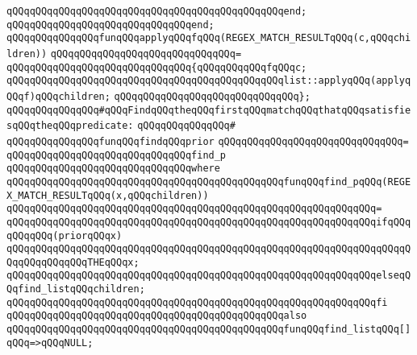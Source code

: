 \verb|qQQqqQQqqQQqqQQqqQQqqQQqqQQqqQQqqQQqqQQqqQQqqQQqend;|\newline
\verb|qQQqqQQqqQQqqQQqqQQqqQQqqQQqqQQqend;|\newline
\newline
\newline
\verb|qQQqqQQqqQQqqQQqfunqQQqapplyqQQqfqQQq(REGEX_MATCH_RESULTqQQq(c,qQQqchildren))|\newline
\verb|qQQqqQQqqQQqqQQqqQQqqQQqqQQqqQQq=|\newline
\verb|qQQqqQQqqQQqqQQqqQQqqQQqqQQqqQQq{qQQqqQQqqQQqfqQQqc;|\newline
\verb|qQQqqQQqqQQqqQQqqQQqqQQqqQQqqQQqqQQqqQQqqQQqqQQqlist::applyqQQq(applyqQQqf)qQQqchildren;|\newline
\verb|qQQqqQQqqQQqqQQqqQQqqQQqqQQqqQQq};|\newline
\newline
\newline
\verb|qQQqqQQqqQQqqQQq#qQQqFindqQQqtheqQQqfirstqQQqmatchqQQqthatqQQqsatisfiesqQQqtheqQQqpredicate:|\newline
\verb|qQQqqQQqqQQqqQQq#|\newline
\verb|qQQqqQQqqQQqqQQqfunqQQqfindqQQqprior|\newline
\verb|qQQqqQQqqQQqqQQqqQQqqQQqqQQqqQQq=|\newline
\verb|qQQqqQQqqQQqqQQqqQQqqQQqqQQqqQQqfind_p|\newline
\verb|qQQqqQQqqQQqqQQqqQQqqQQqqQQqqQQqwhere|\newline
\verb|qQQqqQQqqQQqqQQqqQQqqQQqqQQqqQQqqQQqqQQqqQQqqQQqfunqQQqfind_pqQQq(REGEX_MATCH_RESULTqQQq(x,qQQqchildren))|\newline
\verb|qQQqqQQqqQQqqQQqqQQqqQQqqQQqqQQqqQQqqQQqqQQqqQQqqQQqqQQqqQQqqQQq=|\newline
\verb|qQQqqQQqqQQqqQQqqQQqqQQqqQQqqQQqqQQqqQQqqQQqqQQqqQQqqQQqqQQqqQQqifqQQqqQQqqQQq(priorqQQqx)|\newline
\verb|qQQqqQQqqQQqqQQqqQQqqQQqqQQqqQQqqQQqqQQqqQQqqQQqqQQqqQQqqQQqqQQqqQQqqQQqqQQqqQQqqQQqTHEqQQqx;|\newline
\verb|qQQqqQQqqQQqqQQqqQQqqQQqqQQqqQQqqQQqqQQqqQQqqQQqqQQqqQQqqQQqqQQqelseqQQqfind_listqQQqchildren;|\newline
\verb|qQQqqQQqqQQqqQQqqQQqqQQqqQQqqQQqqQQqqQQqqQQqqQQqqQQqqQQqqQQqqQQqfi|\newline
\newline
\verb|qQQqqQQqqQQqqQQqqQQqqQQqqQQqqQQqqQQqqQQqqQQqqQQqalso|\newline
\verb|qQQqqQQqqQQqqQQqqQQqqQQqqQQqqQQqqQQqqQQqqQQqqQQqfunqQQqfind_listqQQq[]qQQq=>qQQqNULL;|\newline
